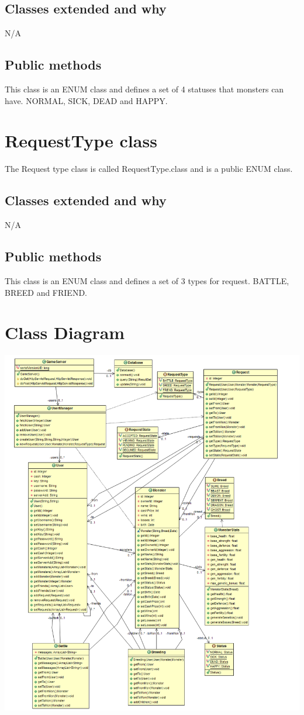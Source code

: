 \documentclass{project}
\begin{document}
\subsection{Classes extended and why}
N/A
\subsection{Public methods}
This class is an ENUM class and defines a set of 4 statuses that monsters can have. NORMAL, SICK, DEAD and HAPPY.


\section{RequestType class}
The Request type class is called RequestType.class and is a public ENUM class.
\subsection{Classes extended and why}
N/A
\subsection{Public methods}
This class is an ENUM class and defines a set of 3 types for request. BATTLE, BREED and FRIEND. 

\section{Class Diagram}
\includegraphics[scale=0.40]{MonsterDiagram.png}
\end{document}
